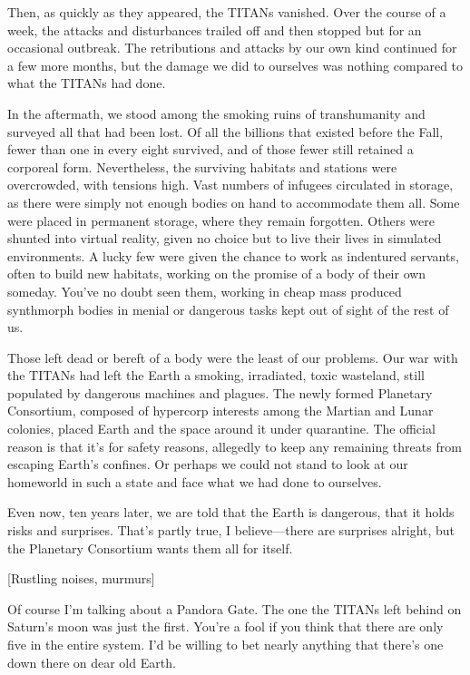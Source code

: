 Then, as quickly as they appeared, the TITANs 
vanished. Over the course of a week, the attacks and 
disturbances trailed off and then stopped but for an 
occasional outbreak. The retributions and attacks by 
our own kind continued for a few more months, but 
the damage we did to ourselves was nothing compared
to what the TITANs had done.

In the aftermath, we stood among the smoking 
ruins of transhumanity and surveyed all that had 
been lost. Of all the billions that existed before 
the Fall, fewer than one in every eight survived, 
and of those fewer still retained a corporeal form. 
Nevertheless, the surviving habitats and stations 
were overcrowded, with tensions high. Vast numbers 
of infugees circulated in storage, as there were simply 
not enough bodies on hand to accommodate them 
all. Some were placed in permanent storage, where 
they remain forgotten. Others were shunted into 
virtual reality, given no choice but to live their lives 
in simulated environments. A lucky few were given 
the chance to work as indentured servants, often 
to build new habitats, working on the promise of a 
body of their own someday. You've no doubt seen 
them, working in cheap mass produced synthmorph 
bodies in menial or dangerous tasks kept out of sight 
of the rest of us.

Those left dead or bereft of a body were the least 
of our problems. Our war with the TITANs had left 
the Earth a smoking, irradiated, toxic wasteland, still 
populated by dangerous machines and plagues. The 
newly formed Planetary Consortium, composed of 
hypercorp interests among the Martian and Lunar 
colonies, placed Earth and the space around it under 
quarantine. The official reason is that it's for safety 
reasons, allegedly to keep any remaining threats from 
escaping Earth's confines. Or perhaps we could not 
stand to look at our homeworld in such a state and 
face what we had done to ourselves.

Even now, ten years later, we are told that the Earth 
is dangerous, that it holds risks and surprises. That's 
partly true, I believe—there are surprises alright, but 
the Planetary Consortium wants them all for itself.

[Rustling noises, murmurs]

Of course I'm talking about a Pandora Gate. The 
one the TITANs left behind on Saturn's moon was 
just the first. You're a fool if you think that there are 
only five in the entire system. I'd be willing to bet 
nearly anything that there's one down there on dear 
old Earth.

